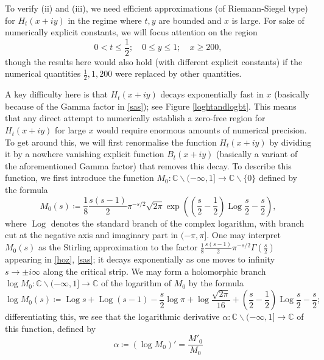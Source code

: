 \documentclass[a4paper,11pt,twoside]{amsart}
\newcommand\C{\mathbb{C}}
\newcommand\Log{{\operatorname{Log}}}
\begin{document}
To verify (ii) and (iii), we need efficient approximations (of Riemann-Siegel type) for $H_t(x+iy)$ in the regime where $t,y$ are bounded and $x$ is large.  For sake of numerically explicit constants, we will focus attention on the region
\begin{equation}\label{region}
0 < t \leq \frac{1}{2}; \quad 0 \leq y \leq 1; \quad x \geq 200,
\end{equation}
though the results here would also hold (with different explicit constants) if the numerical quantities $\frac{1}{2}, 1, 200$ were replaced by other quantities.

A key difficulty here is that $H_t(x+iy)$ decays exponentially fast in $x$ (basically because of the Gamma factor in \eqref{sas}); see Figure \ref{loghtandlogbt}.  This means that any direct attempt to numerically establish a zero-free region for $H_t(x+iy)$ for large $x$ would require enormous amounts of numerical precision.  To get around this, we will first renormalise the function $H_t(x+iy)$ by dividing it by a nowhere vanishing explicit function $B_t(x+iy)$ (basically a variant of the aforementioned Gamma factor) that removes this decay.  To describe this function, we first introduce the function $M_0: \C \backslash (-\infty,1] \to \C \backslash \{0\}$ defined by the formula
\begin{equation}\label{M-def}
 M_0(s) \coloneqq \frac{1}{8} \frac{s(s-1)}{2} \pi^{-s/2} \sqrt{2\pi} \exp\left( \left(\frac{s}{2}-\frac{1}{2}\right)\Log \frac{s}{2} - \frac{s}{2} \right),
\end{equation}
where $\Log$ denotes the standard branch of the complex logarithm, with branch cut at the negative axis and imaginary part in $(-\pi,\pi]$. One may interpret $M_0(s)$ as the Stirling approximation to the factor $\frac{1}{8} \frac{s(s-1)}{2} \pi^{-s/2} \Gamma\left(\frac{s}{2}\right)$ appearing in \eqref{hoz}, \eqref{sas}; it decays exponentially as one moves to infinity $s \to \pm i \infty$ along the critical strip.  We may form a holomorphic branch $\log M_0: \C \backslash (-\infty,1] \to \C$ of the logarithm of $M_0$ by the formula
\begin{equation}\label{logM}
 \log M_0(s) \coloneqq \Log s + \Log(s-1) - \frac{s}{2} \log \pi + \log \frac{\sqrt{2\pi}}{16} + 
 \left(\frac{s}{2}-\frac{1}{2}\right)\Log \frac{s}{2} - \frac{s}{2};
\end{equation}
differentiating this, we see that the logarithmic derivative $\alpha: \C \backslash (-\infty,1] \to \C$ of this function, defined by
\begin{equation}\label{alpha-def}
\alpha \coloneqq (\log M_0)' = \frac{M'_0}{M_0}
\end{equation}
\end{document}
